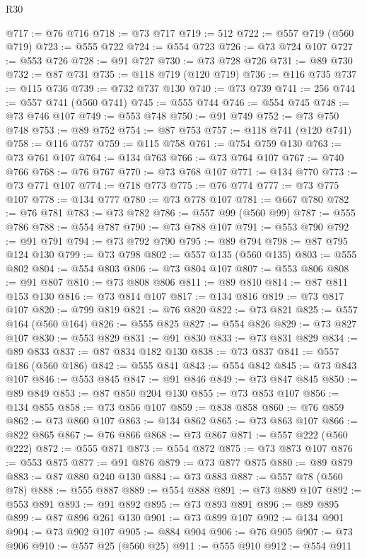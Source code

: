 \begin{lexlean}{R30}
\begin{coremodule}
@717 := @76 @716
@718 := @73 @717
@719 := 512
@722 := @557 @719 (@560 @719)
@723 := @555 @722
@724 := @554 @723
@726 := @73 @724 @107
@727 := @553 @726
@728 := @91 @727
@730 := @73 @728 @726
@731 := @89 @730
@732 := @87 @731
@735 := @118 @719 (@120 @719)
@736 := @116 @735
@737 := @115 @736
@739 := @732 @737 @130
@740 := @73 @739
@741 := 256
@744 := @557 @741 (@560 @741)
@745 := @555 @744
@746 := @554 @745
@748 := @73 @746 @107
@749 := @553 @748
@750 := @91 @749
@752 := @73 @750 @748
@753 := @89 @752
@754 := @87 @753
@757 := @118 @741 (@120 @741)
@758 := @116 @757
@759 := @115 @758
@761 := @754 @759 @130
@763 := @73 @761 @107
@764 := @134 @763
@766 := @73 @764 @107
@767 := @740 @766
@768 := @76 @767
@770 := @73 @768 @107
@771 := @134 @770
@773 := @73 @771 @107
@774 := @718 @773
@775 := @76 @774
@777 := @73 @775 @107
@778 := @134 @777
@780 := @73 @778 @107
@781 := @667 @780
@782 := @76 @781
@783 := @73 @782
@786 := @557 @99 (@560 @99)
@787 := @555 @786
@788 := @554 @787
@790 := @73 @788 @107
@791 := @553 @790
@792 := @91 @791
@794 := @73 @792 @790
@795 := @89 @794
@798 := @87 @795 @124 @130
@799 := @73 @798
@802 := @557 @135 (@560 @135)
@803 := @555 @802
@804 := @554 @803
@806 := @73 @804 @107
@807 := @553 @806
@808 := @91 @807
@810 := @73 @808 @806
@811 := @89 @810
@814 := @87 @811 @153 @130
@816 := @73 @814 @107
@817 := @134 @816
@819 := @73 @817 @107
@820 := @799 @819
@821 := @76 @820
@822 := @73 @821
@825 := @557 @164 (@560 @164)
@826 := @555 @825
@827 := @554 @826
@829 := @73 @827 @107
@830 := @553 @829
@831 := @91 @830
@833 := @73 @831 @829
@834 := @89 @833
@837 := @87 @834 @182 @130
@838 := @73 @837
@841 := @557 @186 (@560 @186)
@842 := @555 @841
@843 := @554 @842
@845 := @73 @843 @107
@846 := @553 @845
@847 := @91 @846
@849 := @73 @847 @845
@850 := @89 @849
@853 := @87 @850 @204 @130
@855 := @73 @853 @107
@856 := @134 @855
@858 := @73 @856 @107
@859 := @838 @858
@860 := @76 @859
@862 := @73 @860 @107
@863 := @134 @862
@865 := @73 @863 @107
@866 := @822 @865
@867 := @76 @866
@868 := @73 @867
@871 := @557 @222 (@560 @222)
@872 := @555 @871
@873 := @554 @872
@875 := @73 @873 @107
@876 := @553 @875
@877 := @91 @876
@879 := @73 @877 @875
@880 := @89 @879
@883 := @87 @880 @240 @130
@884 := @73 @883
@887 := @557 @78 (@560 @78)
@888 := @555 @887
@889 := @554 @888
@891 := @73 @889 @107
@892 := @553 @891
@893 := @91 @892
@895 := @73 @893 @891
@896 := @89 @895
@899 := @87 @896 @261 @130
@901 := @73 @899 @107
@902 := @134 @901
@904 := @73 @902 @107
@905 := @884 @904
@906 := @76 @905
@907 := @73 @906
@910 := @557 @25 (@560 @25)
@911 := @555 @910
@912 := @554 @911

\end{coremodule}
\end{lexlean}
